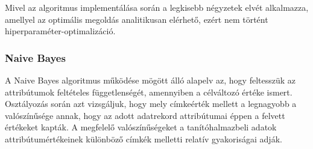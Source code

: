 \documentclass[12pt]{article}
\DeclareMathOperator*{\argmax}{arg\,max}
\begin{document}
Mivel az algoritmus implementálása során a legkisebb négyzetek elvét alkalmazza, amellyel az optimális megoldás analitikusan elérhető, ezért nem történt hiperparaméter-optimalizáció.

\subsubsection{Naive Bayes}

%
%


A Naive Bayes algoritmus működése mögött álló alapelv az, hogy feltesszük az attribútumok feltételes függetlenségét, amennyiben a célváltozó értéke ismert. Osztályozás során azt vizsgáljuk, hogy mely címkeérték mellett a legnagyobb a valószínűsége annak, hogy az adott adatrekord attribútumai éppen a felvett értékeket kapták. A megfelelő valószínűségeket a tanítóhalmazbeli adatok attribútumértékeinek különböző címkék melletti relatív gyakoriságai adják. 
\end{document}
